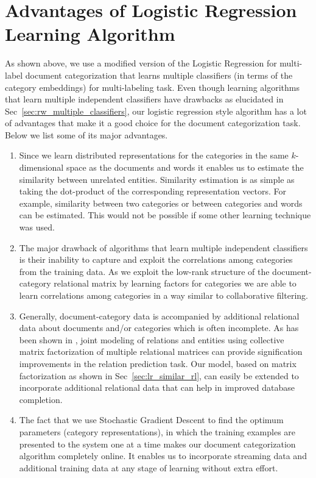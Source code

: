 \section{Advantages of Logistic Regression Learning Algorithm}
\label{sec:adv:lr}
As shown above, we use a modified version of the Logistic Regression for multi-label document categorization that learns multiple classifiers (in terms of the category embeddings) for multi-labeling task. Even though learning algorithms that learn multiple independent classifiers have drawbacks as elucidated in Sec~\ref{sec:rw_multiple_classifiers}, our logistic regression style algorithm has a lot of advantages that make it a good choice for the document categorization task. Below we list some of its major advantages.
\begin{enumerate}
\item 
Since we learn distributed representations for the categories in the same $k$-dimensional space as the documents and words it enables us to estimate the similarity between unrelated entities. Similarity estimation is as simple as taking the dot-product of the corresponding representation vectors. For example, similarity between two categories or between categories and words can be estimated. This would not be possible if some other learning technique was used. 

\item 
The major drawback of algorithms that learn multiple independent classifiers is their inability to capture and exploit the correlations among categories from the training data. As we exploit the low-rank structure of the document-category relational matrix by learning factors for categories we are able to learn correlations among categories in a way similar to collaborative filtering.

\item 
Generally, document-category data is accompanied by additional relational data about documents and/or categories which is often incomplete. As has been shown in \citet{gupta2015collectively}, joint modeling of relations and entities using collective matrix factorization of multiple relational matrices can provide signification improvements in the relation prediction task. 
Our model, based on matrix factorization as shown in Sec~\ref{sec:lr_similar_rl}, can easily be extended to incorporate additional relational data that can help in improved database completion. 

\item 
The fact that we use Stochastic Gradient Descent to find the optimum parameters (category representations), in which the training examples are presented to the system one at a time makes our document categorization algorithm completely online. It enables us to incorporate streaming data and additional training data at any stage of learning without extra effort.  
\end{enumerate}
